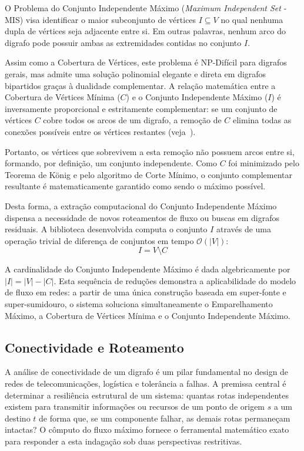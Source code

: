 \documentclass[12pt,a4paper]{article}
\begin{document}
\begin{enumerate}
O Problema do Conjunto Independente Máximo (\textit{Maximum Independent Set} - MIS) visa identificar o maior subconjunto de vértices $I \subseteq V$ no qual nenhuma dupla de vértices seja adjacente entre si. Em outras palavras, nenhum arco do digrafo pode possuir ambas as extremidades contidas no conjunto $I$.

Assim como a Cobertura de Vértices, este problema é NP-Difícil para digrafos gerais, mas admite uma solução polinomial elegante e direta em digrafos bipartidos graças à dualidade complementar. A relação matemática entre a Cobertura de Vértices Mínima ($C$) e o Conjunto Independente Máximo ($I$) é inversamente proporcional e estritamente complementar: se um conjunto de vértices $C$ cobre todos os arcos de um digrafo, a remoção de $C$ elimina todas as conexões possíveis entre os vértices restantes (veja~\cite{cook1998combinatorial}).

Portanto, os vértices que sobrevivem a esta remoção não possuem arcos entre si, formando, por definição, um conjunto independente. Como $C$ foi minimizado pelo Teorema de König e pelo algoritmo de Corte Mínimo, o conjunto complementar resultante é matematicamente garantido como sendo o máximo possível.

Desta forma, a extração computacional do Conjunto Independente Máximo dispensa a necessidade de novos roteamentos de fluxo ou buscas em digrafos residuais. A biblioteca desenvolvida computa o conjunto $I$ através de uma operação trivial de diferença de conjuntos em tempo $\mathcal{O}(|V|)$:
\begin{equation}
    I = V \setminus C
\end{equation}

A cardinalidade do Conjunto Independente Máximo é dada algebricamente por $|I| = |V| - |C|$. Esta sequência de reduções demonstra a aplicabilidade do modelo de fluxo em redes: a partir de uma única construção baseada em super-fonte e super-sumidouro, o sistema soluciona simultaneamente o Emparelhamento Máximo, a Cobertura de Vértices Mínima e o Conjunto Independente Máximo.

\subsection{Conectividade e Roteamento}

A análise de conectividade de um digrafo é um pilar fundamental no design de redes de telecomunicações, logística e tolerância a falhas. A premissa central é determinar a resiliência estrutural de um sistema: quantas rotas independentes existem para transmitir informações ou recursos de um ponto de origem $s$ a um destino $t$ de forma que, se um componente falhar, as demais rotas permaneçam intactas? O cômputo do fluxo máximo fornece o ferramental matemático exato para responder a esta indagação sob duas perspectivas restritivas.


\end{enumerate}
\end{document}
